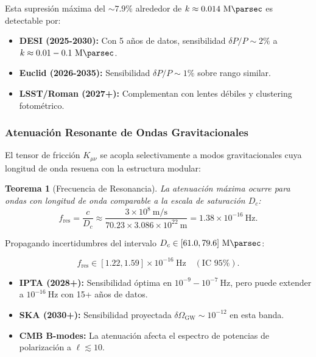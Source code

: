\documentclass[11pt, a4paper]{article}
\theoremstyle{plain}
\newtheorem{teorema}{Teorema}[section]
\theoremstyle{definition}
\begin{document}
Esta supresión máxima del $\sim 7.9\%$ alrededor de $k \approx 0.014\ \si{\per\mega\parsec}$ es detectable por:

\begin{itemize}
    \item \textbf{DESI (2025-2030):} Con 5 años de datos, sensibilidad $\delta P/P \sim 2\%$ a $k \approx 0.01-0.1\ \si{\per\mega\parsec}$.
    \item \textbf{Euclid (2026-2035):} Sensibilidad $\delta P/P \sim 1\%$ sobre rango similar.
    \item \textbf{LSST/Roman (2027+):} Complementan con lentes débiles y clustering fotométrico.
\end{itemize}

\subsubsection{Atenuación Resonante de Ondas Gravitacionales}

El tensor de fricción $K_{\mu\nu}$ se acopla selectivamente a modos gravitacionales cuya longitud de onda resuena con la estructura modular:

\begin{teorema}[Frecuencia de Resonancia]
La atenuación máxima ocurre para ondas con longitud de onda comparable a la escala de saturación $D_c$:
\begin{equation}
f_{\text{res}} = \frac{c}{D_c} \approx \frac{3\times 10^8\ \si{\meter\per\second}}{70.23 \times 3.086\times 10^{22}\ \si{\meter}} = 1.38 \times 10^{-16}\ \si{\hertz}.
\end{equation}
\end{teorema}

Propagando incertidumbres del intervalo $D_c \in [61.0, 79.6]\ \si{\mega\parsec}$:

\begin{equation}
f_{\text{res}} \in [1.22, 1.59] \times 10^{-16}\ \si{\hertz} \quad (\text{IC 95\%}).
\end{equation}

\begin{itemize}
    \item \textbf{IPTA (2028+):} Sensibilidad óptima en $10^{-9}-10^{-7}\ \si{\hertz}$, pero puede extender a $10^{-16}\ \si{\hertz}$ con 15+ años de datos.
    \item \textbf{SKA (2030+):} Sensibilidad proyectada $\delta\Omega_{\text{GW}} \sim 10^{-12}$ en esta banda.
    \item \textbf{CMB B-modes:} La atenuación afecta el espectro de potencias de polarización a $\ell \lesssim 10$.
\end{itemize}
\end{document}

